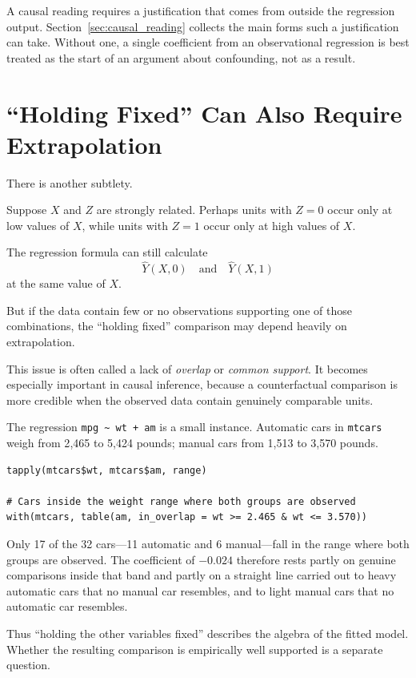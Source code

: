 \documentclass[11pt]{report}
\begin{document}
A causal reading requires a justification that comes from outside the regression output. Section~\ref{sec:causal_reading} collects the main forms such a justification can take. Without one, a single coefficient from an observational regression is best treated as the start of an argument about confounding, not as a result.

\section{``Holding Fixed'' Can Also Require Extrapolation}

There is another subtlety.

Suppose \(X\) and \(Z\) are strongly related. Perhaps units with \(Z=0\) occur only at low values of \(X\), while units with \(Z=1\) occur only at high values of \(X\).

The regression formula can still calculate
\[
\widehat{Y}(X,0)
\quad\text{and}\quad
\widehat{Y}(X,1)
\]
at the same value of \(X\).

But if the data contain few or no observations supporting one of those combinations, the ``holding fixed'' comparison may depend heavily on extrapolation.

This issue is often called a lack of \emph{overlap} or \emph{common support}. It becomes especially important in causal inference, because a counterfactual comparison is more credible when the observed data contain genuinely comparable units.

The regression \texttt{mpg \textasciitilde{} wt + am} is a small instance. Automatic cars in \texttt{mtcars} weigh from 2{,}465 to 5{,}424 pounds; manual cars from 1{,}513 to 3{,}570 pounds.

\begin{lstlisting}
tapply(mtcars$wt, mtcars$am, range)

# Cars inside the weight range where both groups are observed
with(mtcars, table(am, in_overlap = wt >= 2.465 & wt <= 3.570))
\end{lstlisting}

Only 17 of the 32 cars---11 automatic and 6 manual---fall in the range where both groups are observed. The coefficient of \(-0.024\) therefore rests partly on genuine comparisons inside that band and partly on a straight line carried out to heavy automatic cars that no manual car resembles, and to light manual cars that no automatic car resembles.

Thus ``holding the other variables fixed'' describes the algebra of the fitted model. Whether the resulting comparison is empirically well supported is a separate question.
\end{document}
